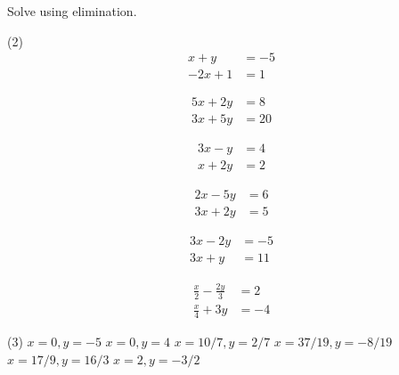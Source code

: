 \documentclass[12pt,fleqn]{book}
\newcommand{\prb}[1]{\begin{Exercise}#1\end{Exercise}}
\newcommand{\sol}[1]{\begin{Answer}#1\end{Answer}}
\begin{document}
\prb{Solve using elimination.
	\begin{tasks}(2)
		\task \vspace{-2.5em}
		\begin{align*}
			x+y   & =-5 \\
			-2x+1 & =1
		\end{align*}

		\vspace{2in}

		\task \vspace{-2.5em}
		\begin{align*}
			5x+2y & = 8  \\
			3x+5y & = 20
		\end{align*}

		\vspace{2in}

		\task \vspace{-2.5em}
		\begin{align*}
			3x-y   & = 4 \\
			x + 2y & =2
		\end{align*}

		\vspace{2in}

		\task \vspace{-2.5em}
		\begin{align*}
			2x-5y & = 6 \\
			3x+2y & = 5
		\end{align*}

		\vspace{2in}

		\task \vspace{-2.5em}
		\begin{align*}
			3x-2y & =-5 \\
			3x+y  & =11
		\end{align*}

		\vspace{2in}

		\task \vspace{-2.5em}
		\begin{align*}
			\frac x2 - \frac {2y}{3} & = 2  \\
			\frac x4 + 3y            & = -4
		\end{align*}

		\vspace{2in}

	\end{tasks}
}
\sol{
	\begin{tasks}(3)
		\task $x=0, y=-5$
		\task $x=0, y=4$
		\task $x=10/7, y=2/7$
		\task $x=37/19, y=-8/19$
		\task $x=17/9, y=16/3$
		\task $x=2, y=-3/2$
	\end{tasks}
}
\end{document}
